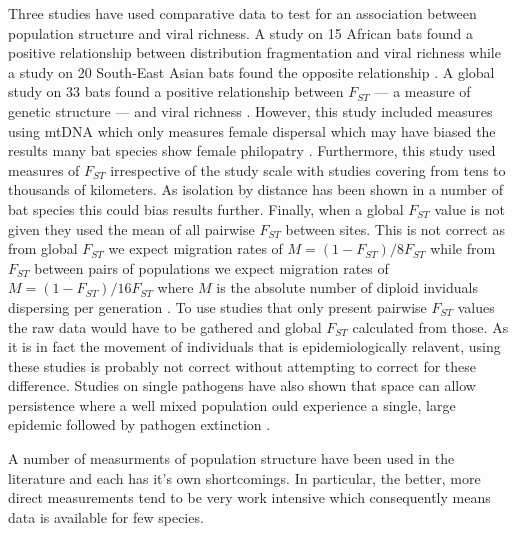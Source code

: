 
Three studies have used comparative data to test for an association between population structure and viral richness.
A study on 15 African bats found a positive relationship between distribution fragmentation and viral richness \cite{maganga2014bat} while a study on 20 South-East Asian bats found the opposite relationship \cite{gay2014parasite}. 
A global study on 33 bats found a positive relationship between $F_{ST}$ --- a measure of genetic structure --- and viral richness \cite{turmelle2009correlates}. 
However, this study included measures using mtDNA which only measures female dispersal which may have biased the results many bat species show female philopatry \cite{kerth2002extreme, hulva2010mechanisms}.
Furthermore, this study used measures of $F_{ST}$ irrespective of the study scale with studies covering from tens \cite{mccracken1981social} to thousands \cite{petit1999male} of kilometers.
As isolation by distance has been shown in a number of bat species \cite{burland1999population, hulva2010mechanisms, o2015genetic, vonhof2015range} this could bias results further.
Finally, when a global $F_{ST}$ value is not given they used the mean of all pairwise $F_{ST}$ between sites.
This is not correct as from global $F_{ST}$ we expect migration rates of $M = (1-F_{ST})/8F_{ST}$ while from $F_{ST}$ between pairs of populations we expect migration rates of $M = (1-F_{ST})/16F_{ST}$ where $M$ is the absolute number of diploid inviduals dispersing per generation \cite{slatkin1995measure}.
To use studies that only present pairwise $F_{ST}$ values the raw data would have to be gathered and global $F_{ST}$ calculated from those.
As it is in fact the movement of individuals that is epidemiologically relavent, using these studies is probably not correct without attempting to correct for these difference.
Studies on single pathogens have also shown that space can allow persistence where a well mixed population ould experience a single, large epidemic followed by pathogen extinction \cite{blackwood2013resolving, pons2014insights, plowright2011urban}.



A number of measurments of population structure have been used in the literature and each has it's own shortcomings.
In particular, the better, more direct measurements tend to be very work intensive which consequently means data is available for few species.


